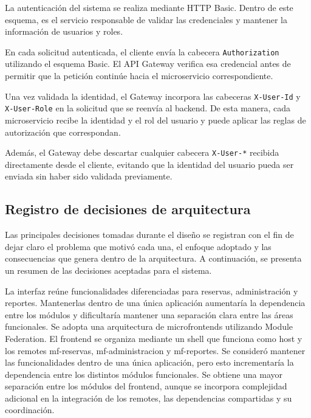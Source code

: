 La autenticación del sistema se realiza mediante HTTP Basic. Dentro de este
esquema,  es el servicio responsable de validar las credenciales
y mantener la información de usuarios y roles.

En cada solicitud autenticada, el cliente envía la cabecera \texttt{Authorization} 
utilizando el esquema Basic. El API Gateway verifica esa credencial antes de
permitir que la petición continúe hacia el microservicio correspondiente.

Una vez validada la identidad, el Gateway incorpora las cabeceras \texttt{X-User-Id} 
y \texttt{X-User-Role} en la solicitud que se reenvía al backend. De esta manera, cada
microservicio recibe la identidad y el rol del usuario y puede aplicar las
reglas de autorización que correspondan.

Además, el Gateway debe descartar cualquier cabecera \texttt{X-User-*} recibida
directamente desde el cliente, evitando que la identidad del usuario pueda ser
enviada sin haber sido validada previamente.

\subsection{Registro de decisiones de arquitectura}
\label{sec:decisiones}

Las principales decisiones tomadas durante el diseño se registran con el fin de
dejar claro el problema que motivó cada una, el enfoque adoptado y las consecuencias
que genera dentro de la arquitectura. A continuación, se presenta un resumen de las
decisiones aceptadas para el sistema.

  {La interfaz reúne funcionalidades diferenciadas para reservas, administración
  y reportes. Mantenerlas dentro de una única aplicación aumentaría la dependencia
  entre los módulos y dificultaría mantener una separación clara entre las áreas
  funcionales.}
  {Se adopta una arquitectura de microfrontends utilizando Module Federation. El
  frontend se organiza mediante un shell que funciona como host y los remotes
  mf-reservas, mf-administracion y mf-reportes.}
  {Se consideró mantener las funcionalidades dentro de una única aplicación, pero
  esto incrementaría la dependencia entre los distintos módulos funcionales.}
  {Se obtiene una mayor separación entre los módulos del frontend, aunque se
  incorpora complejidad adicional en la integración de los remotes, las dependencias
  compartidas y su coordinación.}

